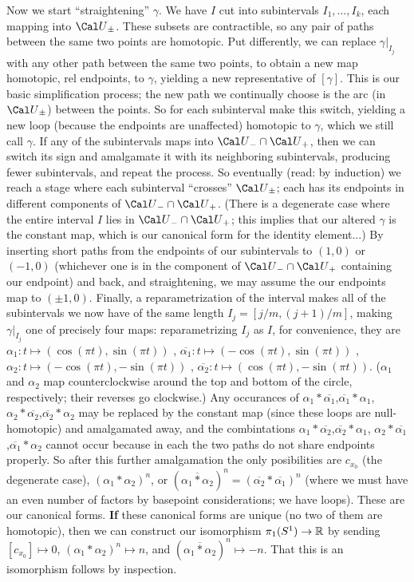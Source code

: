 Now we start ``straightening'' $\gamma$. We have $I$ cut into subintervals $I_1,\ldots,I_k$,
each mapping into ${\Cal U}_\pm$. These subsets are contractible, so any pair
of paths between the same two points are homotopic. Put differently,
we can replace $\gamma|_{I_j}$ with any other path between the same two
points, to obtain a new map homotopic, rel endpoints, to $\gamma$, yielding a 
new representative of $[\gamma]$. This is our basic simplification process; the 
new path we continually choose is the arc (in ${\Cal U}_\pm$) between the points.
So for each subinterval make this switch, yielding a new loop (because the endpoints
are unaffected) homotopic to $\gamma$, which we still call $\gamma$. If any of
the subintervals maps into ${\Cal U}_-\cap{\Cal U}_+$, then we can switch its sign
and amalgamate it with its neighboring subintervals, producing fewer subintervals, 
and repeat the process. So eventually (read: by induction) we reach a stage where
each subinterval ``crosses'' ${\Cal U}_\pm$; each has its endpoints in different
components of ${\Cal U}_-\cap{\Cal U}_+$. (There is a degenerate case where
the entire interval $I$ lies in ${\Cal U}_-\cap{\Cal U}_+$; this implies 
that our altered $\gamma$ is the constant map, which is our canonical form 
for the identity element...) By inserting short paths from the endpoints of our subintervals
to $(1,0)$ or $(-1,0)$ (whichever one is in the component of
${\Cal U}_-\cap{\Cal U}_+$ containing our endpoint) and back, and straightening,
we may assume the our endpoints map to $(\pm 1,0)$. Finally, a reparametrization of the 
interval makes all of the subintervals we now have of the same length $I_j=[j/m,(j+1)/m]$,
making $\gamma|_{I_j}$ one of precisely four maps: reparametrizing $I_j$ as $I$, for convenience,
they are
$\alpha_1:t\mapsto (\cos(\pi t),\sin(\pi t))$ , $\overline{\alpha_1}:t\mapsto (-\cos(\pi t),\sin(\pi t))$ , 
$\alpha_2:t\mapsto (-\cos(\pi t),-\sin(\pi t))$ , $\overline{\alpha_2}:t\mapsto (\cos(\pi t),-\sin(\pi t))$.
($\alpha_1$ and $\alpha_2$ map counterclockwise around the top and bottom of the circle,
respectively; their reverses go clockwise.)
Any occurances of $\alpha_1*\overline{\alpha_1}$,$\overline{\alpha_1}*\alpha_1$,
$\alpha_2*\overline{\alpha_2}$,$\overline{\alpha_2}*\alpha_2$ may be replaced by
the constant map (since these loops are null-homotopic) and amalgamated away, and
the combintations $\alpha_1*\overline{\alpha_2}$,$\overline{\alpha_2}*\alpha_1$,
$\alpha_2*\overline{\alpha_1}$,$\overline{\alpha_1}*\alpha_2$ cannot occur because in each 
the two paths do not share endpoints properly. So after this further amalgamation the only
posibilities are
$c_{x_0}$ (the degenerate case), $(\alpha_1*\alpha_2)^n$, or 
$(\overline{\alpha_1*\alpha_2})^n=(\overline{\alpha_2}*\overline{\alpha_1})^n$
(where we must have an even number of factors by basepoint considerations; we have
loops). These are our canonical forms. {\bf If} these canonical forms are unique (no
two of them are homotopic), then we can construct our isomorphism 
$\pi_1(S^1)\rightarrow {\Bbb R}$ by sending $[c_{x_0}]\mapsto 0$, $(\alpha_1*\alpha_2)^n\mapsto n$, and 
$(\overline{\alpha_1*\alpha_2})^n\mapsto -n$. That this is an isomorphism follows by inspection.

